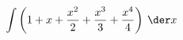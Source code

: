 $\displaystyle \int \left( 1+x+\frac{x^2}{2}+\frac{x^3}{3}+\frac{x^4}{4} \right)   \:\der x $\answercheck
